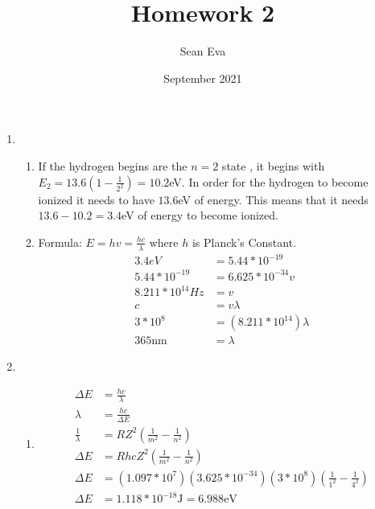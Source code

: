\documentclass{article}
\title{Homework 2}
\author{Sean Eva}
\date{September 2021}
\begin{document}
\maketitle

\begin{enumerate}
    \item 
    
    \begin{enumerate}
        \item 
        
        If the hydrogen begins are the $n=2$ state , it begins with $E_2=13.6(1-\frac{1}{2^2})=10.2$eV. In order for the hydrogen to become ionized it needs to have $13.6$eV of energy. This means that it needs $13.6-10.2=3.4$eV of energy to become ionized.
        
        \item
        
        Formula: $E=hv=\frac{hc}{\lambda}$ where $h$ is Planck's Constant.\\
        \begin{align*}
            3.4eV &= 5.44*10^{-19}\\
            5.44*10^{-19} &= 6.625*10^{-34}v\\
            8.211*10^{14}Hz &= v\\
            c &= v\lambda\\
            3*10^8 &= (8.211*10^{14})\lambda\\
            365\text{nm} &= \lambda
        \end{align*}
        
    \end{enumerate}
    
    \item
    
    \begin{enumerate}
        \item 
        
        \begin{align*}
            \Delta E &= \frac{hc}{\lambda}\\
            \lambda &= \frac{hc}{\Delta E}\\
            \frac{1}{\lambda} &= RZ^2(\frac{1}{m^2}-\frac{1}{n^2})\\
            \Delta E &= RhcZ^2(\frac{1}{m^2}-\frac{1}{n^2})\\
            \Delta E &= (1.097*10^7)(3.625*10^{-34})(3*10^8)(\frac{1}{1^2}-\frac{1}{4^2})\\
            \Delta E &= 1.118*10^{-18}\text{J} = 6.988\text{eV}
        \end{align*}
        

\end{enumerate}
\end{enumerate}
\end{document}
